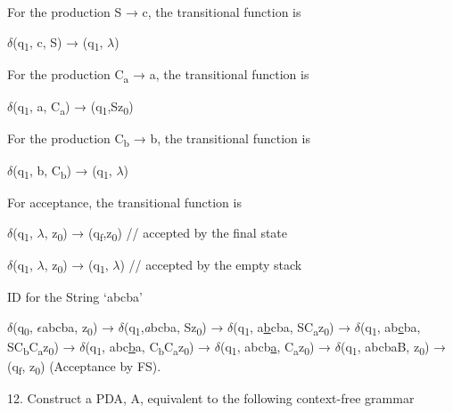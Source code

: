 \documentclass[]{article}
\begin{document}
For the production  S → c, the transitional function is

\begin{center}
$\delta$(q\textsubscript{1}, c, S) → (q\textsubscript{1}, $\lambda$)
\end{center}

For the production   C\textsubscript{a} → a, the transitional function is

\begin{center}
$\delta$(q\textsubscript{1}, a, C\textsubscript{a}) → (q\textsubscript{1},Sz\textsubscript{0})
\end{center}
For the production    C\textsubscript{b} → b, the transitional function is

\begin{center}
$\delta$(q\textsubscript{1}, b, C\textsubscript{b}) → (q\textsubscript{1}, $\lambda$)
\end{center}

For acceptance, the transitional function is
\begin{center}
$\delta$(q\textsubscript{1}, $\lambda$, z\textsubscript{0}) → (q\textsubscript{f},z\textsubscript{0}) // accepted by the final state
\end{center}


\begin{center}
$\delta$(q\textsubscript{1}, $\lambda$, z\textsubscript{0}) → (q\textsubscript{1}, $\lambda$)  // accepted by the empty stack
\end{center}

ID for the String ‘abcba’

\begin{flushleft}
$\delta$(q\textsubscript{0}, \underline{$\epsilon$}abcba, z\textsubscript{0}) → $\delta$(q\textsubscript{1},\emph{a}bcba, Sz\textsubscript{0}) → $\delta$(q\textsubscript{1}, a\underline{b}cba, SC\textsubscript{a}z\textsubscript{0}) → $\delta$(q\textsubscript{1}, ab\underline{c}ba, SC\textsubscript{b}C\textsubscript{a}z\textsubscript{0}) → $\delta$(q\textsubscript{1}, abc\underline{b}a, C\textsubscript{b}C\textsubscript{a}z\textsubscript{0}) → $\delta$(q\textsubscript{1}, abcb\underline{a}, C\textsubscript{a}z\textsubscript{0}) → $\delta$(q\textsubscript{1}, abcbaB, z\textsubscript{0}) → (q\textsubscript{f}, z\textsubscript{0}) (Acceptance by FS).
\end{flushleft}



12. Construct a PDA, A, equivalent to the following context-free grammar
\end{document}
